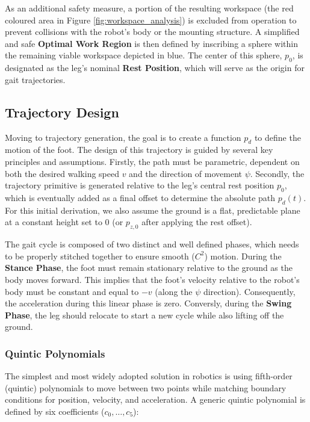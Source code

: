 As an additional safety measure, a portion of the resulting workspace (the red coloured area in Figure
\ref{fig:workspace_analysis}) is excluded from operation to prevent collisions with the robot's body or the mounting
structure. A simplified and safe \textbf{Optimal Work Region} is then defined by inscribing a sphere within the
remaining viable workspace depicted in blue. The center of this sphere, $p_0$, is designated as the leg's nominal
\textbf{Rest Position}, which will serve as the origin for gait trajectories.


\subsection{Trajectory Design}

Moving to trajectory generation, the goal is to create a function $p_d$ to define the motion of the foot.
The design of this trajectory is guided by several key principles and assumptions. Firstly, the path
must be parametric, dependent on both the desired walking speed $v$ and the direction of movement $\psi$.
Secondly, the trajectory primitive is generated relative to the leg's central rest position $p_0$, which is
eventually added as a final offset to determine the absolute path $p_d(t)$. For this initial derivation, we
also assume the ground is a flat, predictable plane at a constant height set to 0 (or $p_{z,0}$ after applying
the rest offset).

The gait cycle is composed of two distinct and well defined phases, which needs to be properly stitched together
to ensure smooth ($C^2$) motion. During the \textbf{Stance Phase}, the foot must remain stationary relative to
the ground as the body moves forward. This implies that the foot's velocity relative to the robot's body must
be constant and equal to $-v$ (along the $\psi$ direction). Consequently, the acceleration during this linear
phase is zero. Conversly, during the \textbf{Swing Phase}, the leg should relocate to start a new cycle
while also lifting off the ground.


\subsubsection{Quintic Polynomials}

The simplest and most widely adopted solution in robotics is using fifth-order (quintic) polynomials
\cite{biagiotti2008trajectory, siciliano2009robotics} to move between two points while matching boundary
conditions for position, velocity, and acceleration. A generic quintic polynomial is defined by six
coefficients ($c_0, \dots, c_5$):

